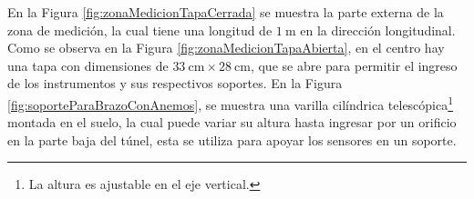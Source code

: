 En la Figura \ref{fig:zonaMedicionTapaCerrada} se muestra la parte externa de la zona de medición, la cual tiene una longitud de $\SI{1}{\meter}$ en la dirección longitudinal. Como se observa en la Figura \ref{fig:zonaMedicionTapaAbierta}, en el centro hay una tapa con dimensiones de $\SI{33}{\centi\meter} \times \SI{28}{\centi\meter}$, que se abre para permitir el ingreso de los instrumentos y sus respectivos soportes. En la Figura \ref{fig:soporteParaBrazoConAnemos}, se muestra una varilla cilíndrica telescópica\footnote{La altura es ajustable en el eje vertical.} montada en el suelo, la cual puede variar su altura hasta ingresar por un orificio en la parte baja del túnel, esta se utiliza para apoyar los sensores en un soporte.

\begin{figure}[H]
    \centering
    \begin{minipage}[b]{0.6\textwidth}
        \centering
    \end{minipage}%
    \hspace{1em} %

\end{figure}
